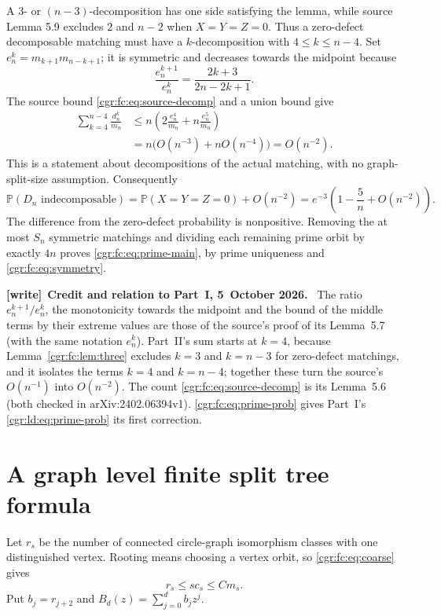 \documentclass[11pt,letterpaper]{article}
\numberwithin{equation}{section}
\theoremstyle{definition}\newtheorem{definition}[theorem]{Definition}
\theoremstyle{remark}\newtheorem{remark}[theorem]{Remark}
\newcommand{\PP}{\mathbb P}
\newenvironment{writenote}[1][]{\par\smallskip\begingroup\small
 \noindent\textbf{[write]}\if\relax\detokenize{#1}\relax\else~\textbf{#1.}\fi\ }%
 {\par\endgroup\smallskip}
\begin{document}
A $3$- or $(n-3)$-decomposition has one side satisfying the
lemma, while source Lemma 5.9 excludes $2$ and $n-2$ when
$X=Y=Z=0$. Thus a zero-defect decomposable matching must have a
$k$-decomposition with $4\le k\le n-4$. Set
$e_n^k=m_{k+1}m_{n-k+1}$; it is symmetric and decreases towards
the midpoint because
\[
 \frac{e_n^{k+1}}{e_n^k}=\frac{2k+3}{2n-2k+1}.
\]
The source bound \eqref{cgr:fc:eq:source-decomp} and a union bound give
\begin{align*}
 \sum_{k=4}^{n-4}\frac{d_n^k}{m_n}
 &\le n\left(2\frac{e_n^4}{m_n}+n\frac{e_n^5}{m_n}\right)\\
 &=n\bigl(O(n^{-3})+nO(n^{-4})\bigr)=O(n^{-2}).
\end{align*}
This is a statement about decompositions of the actual matching,
with no graph-split-size assumption. Consequently
\begin{equation}\label{cgr:fc:eq:prime-prob}
 \PP(D_n\text{ indecomposable})
 =\PP(X=Y=Z=0)+O(n^{-2})
 =e^{-3}\left(1-\frac5n+O(n^{-2})\right).
\end{equation}
The difference from the zero-defect probability is nonpositive.
Removing the at most $S_n$ symmetric matchings and dividing each
remaining prime orbit by exactly $4n$ proves
\eqref{cgr:fc:eq:prime-main}, by prime uniqueness and
\eqref{cgr:fc:eq:symmetry}.
\begin{writenote}[Credit and relation to Part~I, 5~October 2026]
The ratio $e_n^{k+1}/e_n^k$, the monotonicity towards the midpoint and the bound of the middle terms by their extreme values are those of the source's proof of its Lemma~5.7 (with the same notation $e_n^k$). Part~II's sum starts at $k=4$, because Lemma~\ref{cgr:fc:lem:three} excludes $k=3$ and $k=n-3$ for zero-defect matchings, and it isolates the terms $k=4$ and $k=n-4$; together these turn the source's $O(n^{-1})$ into $O(n^{-2})$. The count \eqref{cgr:fc:eq:source-decomp} is its Lemma~5.6 (both checked in arXiv:2402.06394v1). \eqref{cgr:fc:eq:prime-prob} gives Part~I's \eqref{cgr:ld:eq:prime-prob} its first correction.
\end{writenote}

\section{A graph level finite split tree formula}\label{cgr:fc:sec:split}
Let $r_s$ be the number of connected circle-graph isomorphism
classes with one distinguished vertex. Rooting means choosing a
vertex orbit, so \eqref{cgr:fc:eq:coarse} gives
\begin{equation}\label{cgr:fc:eq:root-bound}
 r_s\le s c_s\le C m_s.
\end{equation}
Put $b_j=r_{j+2}$ and $B_d(z)=\sum_{j=0}^d b_jz^j$.
\end{document}
